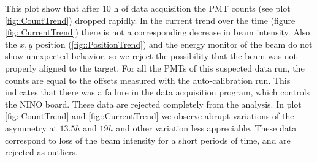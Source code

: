 \begin{figure}[hbtp]
\centering
{}
\end{figure}

This plot show that after 10 h of data acquisition the PMT counts (see plot \ref{fig::CountTrend}) dropped rapidly. In the current trend over the time (figure \ref{fig::CurrentTrend}) there is not a corresponding decrease in beam intensity. Also the $x,y$ position (\ref{fig::PositionTrend}) and the energy monitor of the beam do not show unexpected behavior, so we reject the possibility that the beam was not properly aligned to the target.
For all the PMTs of this suspected data run, the counts are equal to the offsets measured with the auto-calibration run. 
This indicates that there was a failure in the data acquisition program, which controls the NINO board. These data are rejected completely from the analysis.
In plot \ref{fig::CountTrend} and \ref{fig::CurrentTrend} we observe abrupt variations of the asymmetry at $13.5 h$ and $19 h$ and other variation less appreciable. These data correspond to loss of the beam intensity for a short periods of time, and are rejected as outliers. 

